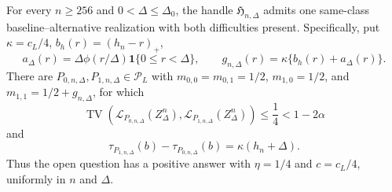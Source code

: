 For every \(n\ge256\) and \(0<\Delta\le\Delta_0\), the handle \(\mathfrak H_{n,\Delta}\) admits one same-class baseline--alternative realization with both difficulties present.  Specifically, put \(\kappa=c_L/4\), \(b_h(r)=(h_n-r)_+\),
\[
 a_\Delta(r)=\Delta\phi(r/\Delta)\mathbf 1\{0\le r<\Delta\},
 \qquad
 g_{n,\Delta}(r)=\kappa\{b_h(r)+a_\Delta(r)\}.
\]
There are \(P_{0,n,\Delta},P_{1,n,\Delta}\in\mathcal P_L\) with \(m_{0,0}=m_{0,1}=1/2\), \(m_{1,0}=1/2\), and \(m_{1,1}=1/2+g_{n,\Delta}\), for which
\[
 \operatorname{TV}\!\left(\mathcal L_{P_{0,n,\Delta}}(Z_\Delta^n),
 \mathcal L_{P_{1,n,\Delta}}(Z_\Delta^n)\right)
 \le\frac14<1-2\alpha
\]
and
\[
 \tau_{P_{1,n,\Delta}}(b)-\tau_{P_{0,n,\Delta}}(b)
 =\kappa(h_n+\Delta).
\]
Thus the open question has a positive answer with \(\eta=1/4\) and \(c=c_L/4\), uniformly in \(n\) and \(\Delta\).